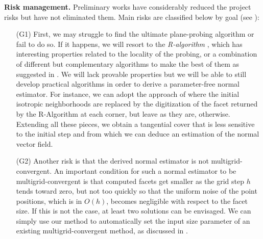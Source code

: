 \noindent\textbf{Risk management.}
Preliminary works have considerably reduced the project risks but have not eliminated them.
Main risks are classified below by goal (see ):
\begin{enumerate}
  \item[(G1)]
First, we may struggle to find the ultimate plane-probing algorithm or fail to do so.
If it happens, we will resort to the \emph{R-algorithm} \cite{LPRJMIV2017}, which
has interesting properties related to the locality of the probing, or a combination
of different but complementary algorithms to make the best of them as suggested in
\cite{LPRJMIV2017}. We will lack provable properties but we will be able to still
develop practical algorithms in order to derive a parameter-free normal estimator.
For instance, we can adopt the approach of \citeauthor*{Charrier2011} \cite{Charrier2011}
where the initial isotropic neighborhoods are replaced by the digitization of the facet
returned by the R-Algorithm at each corner, but leave as they are, otherwise. Extending all
these pieces, we obtain a tangential cover that is less sensitive to the initial step and
from which we can deduce an estimation of the normal vector field.  
\item[(G2)]
Another risk is that the derived normal estimator is not multigrid-convergent.
An important condition for such a normal estimator to be multigrid-convergent
is that computed facets get smaller as the grid step $h$ tends toward zero,
but not too quickly so that the uniform noise of the point positions,
which is in $O(h)$, becomes negligible with respect to the facet size. 
If this is not the case, at least two solutions can be envisaged. 
We can simply use our method to automatically set the input size
parameter of an existing multigrid-convergent method, as discussed in .

\end{enumerate}
